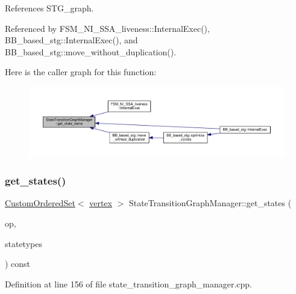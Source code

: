References S\+T\+G\+\_\+graph.



Referenced by F\+S\+M\+\_\+\+N\+I\+\_\+\+S\+S\+A\+\_\+liveness\+::\+Internal\+Exec(), B\+B\+\_\+based\+\_\+stg\+::\+Internal\+Exec(), and B\+B\+\_\+based\+\_\+stg\+::move\+\_\+without\+\_\+duplication().

Here is the caller graph for this function\+:
\nopagebreak
\begin{figure}[H]
\begin{center}
\leavevmode
\includegraphics[width=350pt]{d9/dfd/classStateTransitionGraphManager_a4cc1e1dafee9039389d7c273568d4e9a_icgraph}
\end{center}
\end{figure}
\mbox{\label{classStateTransitionGraphManager_ac6b2201c821c65cbf25d0578eacdbb51}} 
\subsubsection{\texorpdfstring{get\+\_\+states()}{get\_states()}}
{\footnotesize\ttfamily \hyperlink{classCustomOrderedSet}{Custom\+Ordered\+Set}$<$ \hyperlink{graph_8hpp_abefdcf0544e601805af44eca032cca14}{vertex} $>$ State\+Transition\+Graph\+Manager\+::get\+\_\+states (\begin{DoxyParamCaption}\item[{const \hyperlink{graph_8hpp_abefdcf0544e601805af44eca032cca14}{vertex} \&}]{op,  }\item[{\hyperlink{classStateTransitionGraphManager_a97cb88662c4d757e2b09cadd3ccad814}{State\+Types}}]{statetypes }\end{DoxyParamCaption}) const\hspace{0.3cm}{\ttfamily [private]}}



Definition at line 156 of file state\+\_\+transition\+\_\+graph\+\_\+manager.\+cpp.



